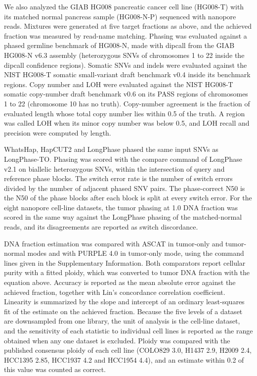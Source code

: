 \documentclass[unnumsec,webpdf,contemporary,large]{oup-authoring-template}
\begin{document}
We also analyzed the GIAB HG008 pancreatic cancer cell line (HG008-T) with its matched normal pancreas sample (HG008-N-P) sequenced with nanopore reads. Mixtures were generated at five target fractions as above, and the achieved fraction was measured by read-name matching. Phasing was evaluated against a phased germline benchmark of HG008-N, made with dipcall from the GIAB HG008-N v6.3 assembly (heterozygous SNVs of chromosomes 1 to 22 inside the dipcall confidence regions). Somatic SNVs and indels were evaluated against the NIST HG008-T somatic small-variant draft benchmark v0.4 inside its benchmark regions. Copy number and LOH were evaluated against the NIST HG008-T somatic copy-number draft benchmark v0.6 on its PASS regions of chromosomes 1 to 22 (chromosome 10 has no truth). Copy-number agreement is the fraction of evaluated length whose total copy number lies within 0.5 of the truth. A region was called LOH when its minor copy number was below 0.5, and LOH recall and precision were computed by length.

WhatsHap, HapCUT2 and LongPhase phased the same input SNVs as LongPhase-TO. Phasing was scored with the compare command of LongPhase v2.1 on biallelic heterozygous SNVs, within the intersection of query and reference phase blocks. The switch error rate is the number of switch errors divided by the number of adjacent phased SNV pairs. The phase-correct N50 is the N50 of the phase blocks after each block is split at every switch error. For the eight nanopore cell-line datasets, the tumor phasing at 1.0 DNA fraction was scored in the same way against the LongPhase phasing of the matched-normal reads, and its disagreements are reported as switch discordance.

DNA fraction estimation was compared with ASCAT in tumor-only and tumor-normal modes and with PURPLE 4.0 in tumor-only mode, using the command lines given in the Supplementary Information. Both comparators report cellular purity with a fitted ploidy, which was converted to tumor DNA fraction with the equation above. Accuracy is reported as the mean absolute error against the achieved fraction, together with Lin's concordance correlation coefficient. Linearity is summarized by the slope and intercept of an ordinary least-squares fit of the estimate on the achieved fraction. Because the five levels of a dataset are downsampled from one library, the unit of analysis is the cell-line dataset, and the sensitivity of each statistic to individual cell lines is reported as the range obtained when any one dataset is excluded. Ploidy was compared with the published consensus ploidy of each cell line (COLO829 3.0, H1437 2.9, H2009 2.4, HCC1395 2.85, HCC1937 4.2 and HCC1954 4.4), and an estimate within 0.2 of this value was counted as correct.
\end{document}
